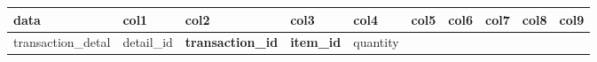 \documentclass[11pt]{article}
\begin{document}
\begin{longtable}[]{@{}llllllllll@{}}
\toprule
\begin{minipage}[b]{0.03\columnwidth}\raggedright\strut
data\strut
\end{minipage} & \begin{minipage}[b]{0.03\columnwidth}\raggedright\strut
col1\strut
\end{minipage} & \begin{minipage}[b]{0.03\columnwidth}\raggedright\strut
col2\strut
\end{minipage} & \begin{minipage}[b]{0.03\columnwidth}\raggedright\strut
col3\strut
\end{minipage} & \begin{minipage}[b]{0.03\columnwidth}\raggedright\strut
col4\strut
\end{minipage} & \begin{minipage}[b]{0.03\columnwidth}\raggedright\strut
col5\strut
\end{minipage} & \begin{minipage}[b]{0.03\columnwidth}\raggedright\strut
col6\strut
\end{minipage} & \begin{minipage}[b]{0.03\columnwidth}\raggedright\strut
col7\strut
\end{minipage} & \begin{minipage}[b]{0.03\columnwidth}\raggedright\strut
col8\strut
\end{minipage} & \begin{minipage}[b]{0.03\columnwidth}\raggedright\strut
col9\strut
\end{minipage}\tabularnewline
\midrule
\endhead
\begin{minipage}[t]{0.03\columnwidth}\raggedright\strut
transaction\_detal\strut
\end{minipage} & \begin{minipage}[t]{0.03\columnwidth}\raggedright\strut
detail\_id\strut
\end{minipage} & \begin{minipage}[t]{0.03\columnwidth}\raggedright\strut
\textbf{transaction\_id}\strut
\end{minipage} & \begin{minipage}[t]{0.03\columnwidth}\raggedright\strut
\textbf{item\_id}\strut
\end{minipage} & \begin{minipage}[t]{0.03\columnwidth}\raggedright\strut
quantity\strut
\end{minipage} & \begin{minipage}[t]{0.03\columnwidth}\raggedright\strut

\end{minipage}
\end{longtable}
\end{document}
